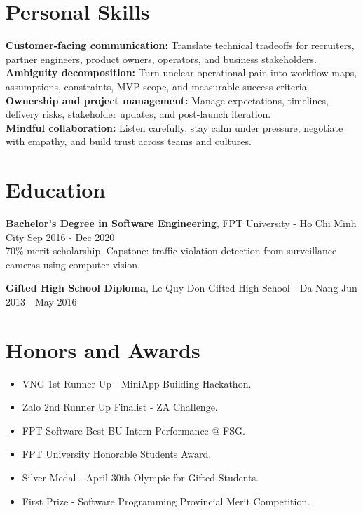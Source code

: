 \documentclass[10pt,letterpaper]{article}
\begin{document}
\section*{Personal Skills}
\textbf{Customer-facing communication:} Translate technical tradeoffs for recruiters, partner engineers, product owners, operators, and business stakeholders.\\
\textbf{Ambiguity decomposition:} Turn unclear operational pain into workflow maps, assumptions, constraints, MVP scope, and measurable success criteria.\\
\textbf{Ownership and project management:} Manage expectations, timelines, delivery risks, stakeholder updates, and post-launch iteration.\\
\textbf{Mindful collaboration:} Listen carefully, stay calm under pressure, negotiate with empathy, and build trust across teams and cultures.

\section*{Education}
\textbf{Bachelor's Degree in Software Engineering}, FPT University - Ho Chi Minh City \hfill {\small\textcolor{textgray}{Sep 2016 - Dec 2020}}\\
70\% merit scholarship. Capstone: traffic violation detection from surveillance cameras using computer vision.

\textbf{Gifted High School Diploma}, Le Quy Don Gifted High School - Da Nang \hfill {\small\textcolor{textgray}{Jun 2013 - May 2016}}

\section*{Honors and Awards}
\begin{itemize}
  \item VNG 1st Runner Up - MiniApp Building Hackathon.
  \item Zalo 2nd Runner Up Finalist - ZA Challenge.
  \item FPT Software Best BU Intern Performance @ FSG.
  \item FPT University Honorable Students Award.
  \item Silver Medal - April 30th Olympic for Gifted Students.
  \item First Prize - Software Programming Provincial Merit Competition.
\end{itemize}
\end{document}
